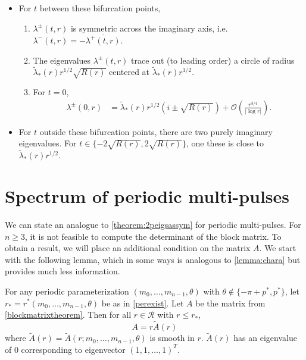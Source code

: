 \documentclass[thesis.tex]{subfiles}
\begin{document}
\begin{theorem}
\begin{itemize}
\item For $t$ between these bifurcation points, 
\begin{enumerate}
\item $\lambda^\pm(t, r)$ is symmetric across the imaginary axis, i.e. $\lambda^-(t, r) = -\overline{\lambda^+(t, r)}$. 
\item The eigenvalues $\lambda^\pm(t, r)$ trace out (to leading order) a circle of radius $\tilde{\lambda}_*(r) r^{1/2} \sqrt{ R(r)}$ centered at $\tilde{\lambda}_*(r) r^{1/2}$. 
\item For $t = 0$,
\begin{align*}
\lambda^\pm(0, r) &= \tilde{\lambda}_*(r) r^{1/2}\left(  i \pm \sqrt{ R(r)} \right)  + \mathcal{O}\left( \frac{r^{3/4}}{|\log r|} \right).
\end{align*}
\end{enumerate}

\item For $t$ outside these bifurcation points, there are two purely imaginary eigenvalues. For $t \in \{ -2\sqrt{R(r)}, 2\sqrt{R(r)} \}$, one these is close to $\tilde{\lambda}_*(r) r^{1/2}$.

\end{itemize}

\end{theorem}

\section{Spectrum of periodic multi-pulses}

We can state an analogue to \cref{theorem:2peigsassym} for periodic multi-pulses. For $n \geq 3$, it is not feasible to compute the determinant of the block matrix. To obtain a result, we will place an additional condition on the matrix $A$. We start with the following lemma, which in some ways is analogous to \cref{lemma:chara} but provides much less information.

\begin{lemma}\label{lemma:charmatrixA}
For any periodic parameterization $(m_0, \dots, m_{n-1}, \theta)$ with $\theta \notin \{-\pi + p^*, p^* \}$, let $r_* = r^*(m_0, \dots, m_{n-1}, \theta)$ be as in \cref{perexist}. Let $A$ be the matrix from \cref{blockmatrixtheorem}. Then for all $r \in \mathcal{R}$ with $r \leq r_*$,
\[
A = r \tilde{A}(r)
\]
where $\tilde{A}(r) = \tilde{A}(r; m_0, \dots, m_{n-1}, \theta)$ is smooth in $r$. $\tilde{A}(r)$ has an eigenvalue of 0 corresponding to eigenvector $(1, 1, \dots, 1)^T$. 
\end{lemma}
\end{document}
